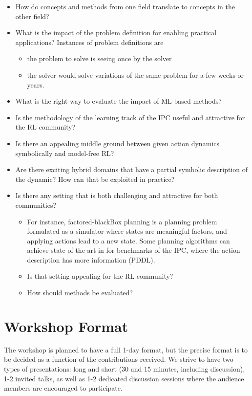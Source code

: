\documentclass[10pt]{article}
\begin{document}
\begin{itemize}
\item How do concepts and methods from one field translate to concepts in the other field?
%
%
\item What is the impact of the problem definition for enabling practical applications? Instances of problem definitions are
%
\begin{itemize}
%
\item the problem to solve is seeing once by the solver
%
\item the solver would solve variations of the same problem for a few weeks or years.
%
\end{itemize}
\item What is the right way to evaluate the impact of ML-based methods? 
%
\item Is the methodology of the learning track of the IPC useful and attractive for the RL community?
%
\item Is there an appealing middle ground between given action dynamics symbolically and model-free RL? 
%
\item Are there exciting hybrid domains that have a partial symbolic description of the dynamic? How can that be exploited in practice?
%
%
\item Is there any setting that is both challenging and attractive for both communities? 
%
\begin{itemize}
\item For instance, factored-blackBox planning is a planning problem formulated as a simulator where states are meaningful factors, and applying actions lead to a new state. Some planning algorithms can achieve state of the art in for benchmarks of the IPC, where the action description has more information (PDDL). 
%
\item Is that setting appealing for the RL community?
%
\item How should methods be evaluated?
%
\end{itemize}
\end{itemize}

\section*{Workshop Format}

The workshop is planned to have a full 1-day format, but the precise format is
to be decided as a function of the contributions received. We strive to have two
types of presentations: long and short (30 and 15 minutes, including
discussion), 1-2 invited talks, as well as 1-2 dedicated discussion sessions
where the audience members are encouraged to participate.
\end{document}
